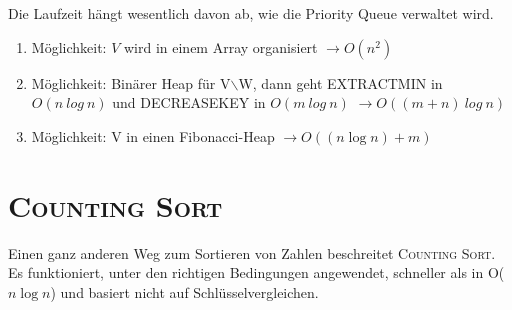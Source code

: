 Die Laufzeit hängt wesentlich davon ab, wie die Priority Queue verwaltet wird.
\begin{enumerate}
\item Möglichkeit: $V$ wird in einem Array organisiert \hfill $\rightarrow O(n^{2})$
\item Möglichkeit: Binärer Heap für V$\backslash$W, dann geht EXTRACTMIN in $O(n\ log\ n)$ und DECREASEKEY in $O(m\ log\ n)$ \hfill $\rightarrow O((m+n)\ log\ n)$
\item Möglichkeit: V in einen Fibonacci-Heap \hfill $\rightarrow O((n \log n)+m)$
\end{enumerate} 
%
%
  \section{\textsc{Counting Sort}}
  Einen ganz anderen Weg zum Sortieren von Zahlen beschreitet \textsc{Counting Sort}.
  Es funktioniert, unter den richtigen Bedingungen angewendet, schneller als in O($n \log n$) und basiert nicht auf
  Schlüsselvergleichen.

